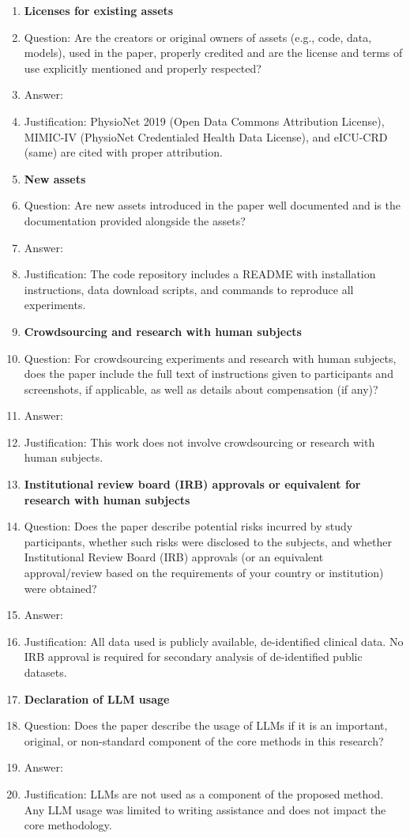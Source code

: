 \documentclass{article}
\begin{document}
\begin{enumerate}
\item {\bf Licenses for existing assets}
    \item[] Question: Are the creators or original owners of assets (e.g., code, data, models), used in the paper, properly credited and are the license and terms of use explicitly mentioned and properly respected?
    \item[] Answer: \answerYes{}
    \item[] Justification: PhysioNet 2019 (Open Data Commons Attribution License), MIMIC-IV (PhysioNet Credentialed Health Data License), and eICU-CRD (same) are cited with proper attribution.

\item {\bf New assets}
    \item[] Question: Are new assets introduced in the paper well documented and is the documentation provided alongside the assets?
    \item[] Answer: \answerYes{}
    \item[] Justification: The code repository includes a README with installation instructions, data download scripts, and commands to reproduce all experiments.

\item {\bf Crowdsourcing and research with human subjects}
    \item[] Question: For crowdsourcing experiments and research with human subjects, does the paper include the full text of instructions given to participants and screenshots, if applicable, as well as details about compensation (if any)?
    \item[] Answer: \answerNA{}
    \item[] Justification: This work does not involve crowdsourcing or research with human subjects.

\item {\bf Institutional review board (IRB) approvals or equivalent for research with human subjects}
    \item[] Question: Does the paper describe potential risks incurred by study participants, whether such risks were disclosed to the subjects, and whether Institutional Review Board (IRB) approvals (or an equivalent approval/review based on the requirements of your country or institution) were obtained?
    \item[] Answer: \answerNA{}
    \item[] Justification: All data used is publicly available, de-identified clinical data. No IRB approval is required for secondary analysis of de-identified public datasets.

\item {\bf Declaration of LLM usage}
    \item[] Question: Does the paper describe the usage of LLMs if it is an important, original, or non-standard component of the core methods in this research?
    \item[] Answer: \answerNo{}
    \item[] Justification: LLMs are not used as a component of the proposed method. Any LLM usage was limited to writing assistance and does not impact the core methodology.

\end{enumerate}
\end{document}
